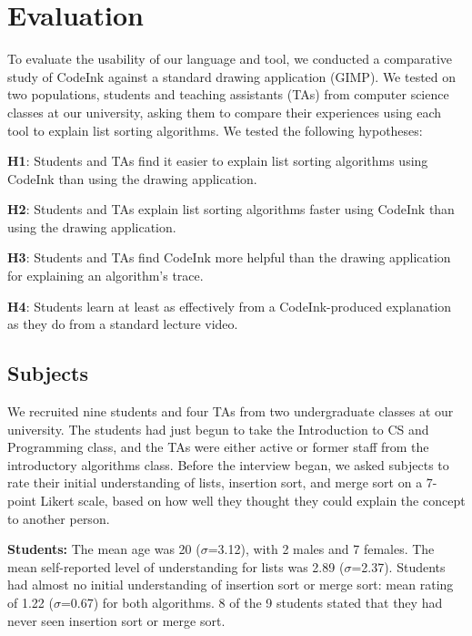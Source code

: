 \section{Evaluation}


To evaluate the usability of our language and tool, we conducted a
comparative study of CodeInk against a standard drawing application
(GIMP). We tested on two populations, students and teaching assistants
(TAs) from computer science classes at our university, asking them to compare their
experiences using each tool to explain list sorting algorithms. We
tested the following hypotheses:


\noindent \textbf{H1}: Students and TAs find it easier to explain list sorting
algorithms using CodeInk than using the drawing application.

\noindent \textbf{H2}: Students and TAs explain list sorting algorithms
faster using CodeInk than using the drawing application.

\noindent \textbf{H3}: Students and TAs find CodeInk more helpful than
the drawing application for explaining an algorithm's trace.

\noindent \textbf{H4}: Students learn at least as effectively from a
CodeInk-produced explanation as they do from a standard lecture video.

\subsection{Subjects}
We recruited nine students and four TAs from two undergraduate classes
at our university. The students had just begun to take the Introduction to CS and Programming
class, and the TAs were either active or former staff from the introductory
algorithms class. Before the interview began, we asked subjects to rate their
initial understanding of lists, insertion sort, and merge sort on a 7-point Likert
scale, based on how well they thought they could explain the concept to another
person.

\noindent \textbf{Students:} The mean age was 20 ($\sigma$=3.12), with 2 males
and 7 females. The mean self-reported level of understanding for lists was 2.89
($\sigma$=2.37). Students had almost no initial understanding of insertion sort
or merge sort: mean rating of 1.22 ($\sigma$=0.67) for both algorithms. 8 of the
9 students stated that they had never seen insertion sort or merge sort.

